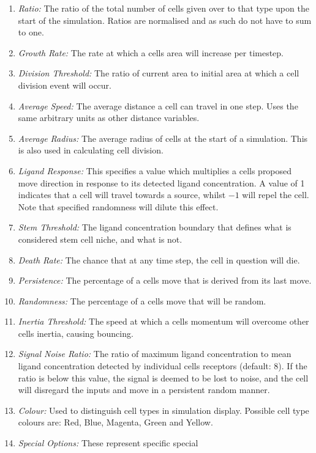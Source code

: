 \documentclass[12pt]{article}
\begin{document}
\begin{enumerate}
\item {\itshape Ratio: }The ratio of the total number of cells given 
over to that type upon the start of the simulation. Ratios are 
normalised and as such do not have to sum to one.
\item {\itshape Growth Rate: }The rate at which a cells area will 
increase per timestep.
\item {\itshape Division Threshold: }The ratio of current area to 
initial area at which a cell division event will occur.
\item {\itshape Average Speed: }The average distance a cell can travel 
in one step. Uses the same arbitrary units as other distance variables.
\item {\itshape Average Radius: }The average radius of cells at the 
start of a simulation. This is also used in calculating cell division.
\item {\itshape Ligand Response: }This specifies a value which 
multiplies a cells proposed move direction in response to its detected 
ligand concentration. A value of 1 indicates that a cell will travel 
towards a source, whilst \(-1\) will repel the cell. Note that specified 
randomness will dilute this effect.
\item {\itshape Stem Threshold: }The ligand concentration boundary that 
defines what is considered stem cell niche, and what is not.
\item {\itshape Death Rate: }The chance that at any time step, the cell 
in question will die.
\item {\itshape Persistence: }The percentage of a cells move that is 
derived from its last move.
\item {\itshape Randomness: }The percentage of a cells move that will be 
random.
\item {\itshape Inertia Threshold: }The speed at which a cells momentum 
will overcome other cells inertia, causing bouncing.
\item {\itshape Signal Noise Ratio: }The ratio of maximum ligand 
concentration to mean ligand concentration detected by individual cells 
receptors (default: 8). If the ratio is below this value, the signal is 
deemed to be lost to noise, and the cell will disregard the inputs and 
move in a persistent random manner.
\item {\itshape Colour:} Used to distinguish cell types in simulation 
display. Possible cell type colours are: Red, Blue, Magenta, Green and 
Yellow.
\item {\itshape Special Options: }These represent specific special 

\end{enumerate}
\end{document}
